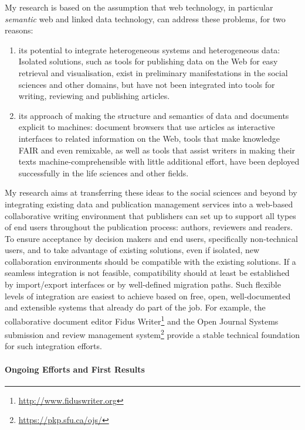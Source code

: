 \documentclass[a4paper,UKenglish]{dagrep}
\begin{document}
My research is based on the assumption that web technology, in particular
\emph{semantic} web and linked data technology, can address these problems, for
two reasons:
\begin{enumerate}
\item its potential to integrate heterogeneous systems and heterogeneous data:
Isolated solutions, such as tools for publishing data on the Web for easy
retrieval and visualisation, exist in preliminary manifestations in the social
sciences and other domains, but have not been integrated into tools for writing,
reviewing and publishing articles.
\item its approach of making the structure and semantics of data and documents
explicit to machines: document browsers that use articles as interactive
interfaces to related information on the Web, tools that make knowledge FAIR and
even remixable, as well as tools that assist writers in making their texts
machine-comprehensible with little additional effort, have been deployed
successfully in the life sciences and other fields.
\end{enumerate}

My research aims at transferring these ideas to the social sciences and beyond
by integrating existing data and publication management services into a
web-based collaborative writing environment that publishers can set up to
support all types of end users throughout the publication process: authors,
reviewers and readers.
To ensure acceptance by decision makers and end users, specifically
non-technical users, and to take advantage of existing solutions, even if
isolated, new collaboration environments should be compatible with the existing
solutions.
If a seamless integration is not feasible, compatibility should at least be
established by import/export interfaces or by well-defined migration paths.
Such flexible levels of integration are easiest to achieve based on free, open,
well-documented and extensible systems that already do part of the job.
For example, the collaborative document editor Fidus
Writer\footnote{\url{http://www.fiduswriter.org}} and the Open Journal Systems
submission and review management system\footnote{\url{https://pkp.sfu.ca/ojs/}}
provide a stable technical foundation for such integration efforts.

\paragraph{Ongoing Efforts and First Results}
\end{document}
